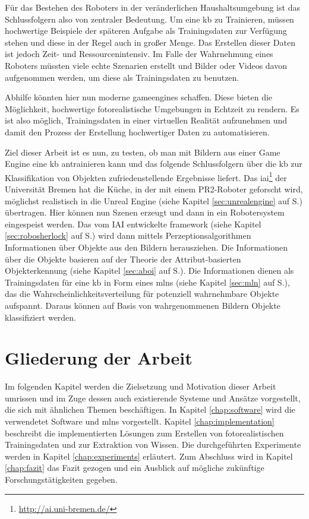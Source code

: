 Für das Bestehen des Roboters in der veränderlichen Haushaltsumgebung ist das Schlussfolgern also von zentraler Bedeutung. Um eine \gls{kb} zu Trainieren, müssen hochwertige Beispiele der späteren Aufgabe als Trainingsdaten zur Verfügung stehen und diese in der Regel auch in großer Menge. Das Erstellen dieser Daten ist jedoch Zeit- und Ressourcenintensiv. Im Falle der Wahrnehmung eines Roboters müssten viele echte Szenarien erstellt und Bilder oder Videos davon aufgenommen werden, um diese als Trainingsdaten zu benutzen. \par  
    
Abhilfe könnten hier nun moderne \glspl{gameengine} schaffen. Diese bieten die Möglichkeit, hochwertige fotorealistische Umgebungen in Echtzeit zu rendern. Es ist also möglich, Trainingsdaten in einer virtuellen Realität aufzunehmen und damit den Prozess der Erstellung hochwertiger Daten zu automatisieren. \par  

Ziel dieser Arbeit ist es nun, zu testen, ob man mit Bildern aus einer Game Engine eine \gls{kb} antrainieren kann und das folgende Schlussfolgern über die \gls{kb} zur Klassifikation von Objekten zufriedenstellende Ergebnisse liefert. Das \gls{iai}\footnote{\url{http://ai.uni-bremen.de/}} der Universität Bremen hat die Küche, in der mit einem PR2-Roboter geforscht wird, möglichst realistisch in die Unreal Engine (siehe Kapitel \ref{sec:unrealengine} auf S.\pageref{sec:unrealengine}) übertragen. Hier können nun Szenen erzeugt und dann in ein Robotersystem eingespeist werden. Das vom IAI entwickelte \gls{framework} \robosherlock (siehe Kapitel \ref{sec:robosherlock} auf S.\pageref{sec:robosherlock}) wird dann mittels Perzeptionsalgorithmen Informationen über Objekte aus den Bildern herausziehen. Die Informationen über die Objekte basieren auf der Theorie der Attribut-basierten Objekterkennung (siehe Kapitel \ref{sec:aboi} auf S.\pageref{sec:aboi}). Die Informationen dienen als Trainingsdaten für eine \gls{kb} in Form eines \gls{mlns} (siehe Kapitel \ref{sec:mln} auf S.\pageref{sec:mln}), das die Wahrscheinlichkeitsverteilung für potenziell wahrnehmbare Objekte aufspannt. Daraus können auf Basis von wahrgenommenen Bildern Objekte klassifiziert werden.  

\section{Gliederung der Arbeit}
\label{sec:gliederung}

Im folgenden Kapitel werden die Zielsetzung und Motivation dieser Arbeit umrissen und im Zuge dessen auch existierende Systeme und Ansätze vorgestellt, die sich mit ähnlichen Themen beschäftigen. In Kapitel \ref{chap:software} wird die verwendetet Software und \glspl{mln} vorgestellt. Kapitel \ref{chap:implementation} beschreibt die implementierten Lösungen zum Erstellen von fotorealistischen Trainingsdaten und zur Extraktion von Wissen. Die durchgeführten Experimente werden in Kapitel \ref{chap:experiments} erläutert. Zum Abschluss wird in Kapitel \ref{chap:fazit} das Fazit gezogen und ein Ausblick auf mögliche zukünftige Forschungstätigkeiten gegeben. 

   

